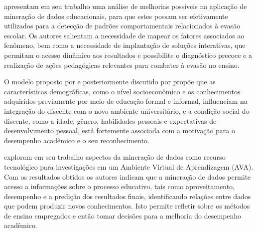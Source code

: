  apresentam em seu trabalho uma análise de melhorias possíveis na aplicação de mineração de dados educacionais, para que estes possam ser efetivamente utilizados para a detecção de padrões comportamentais relacionados à evasão escolar. 
Os autores salientam a necessidade de mapear os fatores associados ao fenômeno, bem como a necessidade de implantação de soluções interativas, que permitam o acesso dinâmico aos resultados e possibilite o diagnóstico precoce e a realização de ações pedagógicas relevantes para combater à evasão no ensino. 

O modelo proposto por  e posteriormente discutido por  propõe que as características demográficas, como o nível socioeconômico e os conhecimentos adquiridos previamente por meio de educação formal e informal, influenciam na integração do discente com o novo ambiente universitário, e a condição social do discente, como a idade, gênero, habilidades pessoais e expectativas de desenvolvimento pessoal, está fortemente associada com a motivação para o desempenho acadêmico e o seu reconhecimento.

 exploram em seu trabalho aspectos da mineração de dados como recurso tecnológico para investigações em um Ambiente Virtual de Aprendizagem (AVA). 
Com os resultados obtidos os autores indicam que a mineração de dados permite acesso a informações sobre o processo educativo, tais como aproveitamento, desempenho e a predição dos resultados finais, identificando relações entre dados que podem produzir novos conhecimentos. 
Isto permite refletir sobre os métodos de ensino empregados e então tomar decisões para a melhoria do desempenho acadêmico.
